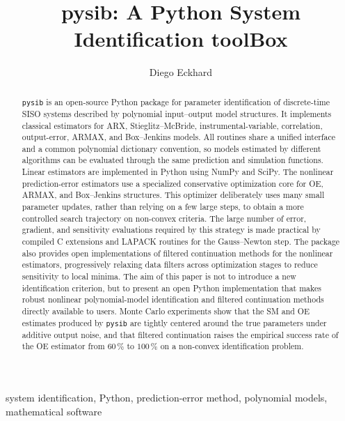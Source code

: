\documentclass{ifacconf}
\begin{document}
\begin{frontmatter}

\title{pysib: A Python System Identification toolBox}

\author[First]{Diego Eckhard}
\address[First]{Universidade Federal do Rio Grande do Sul, Porto Alegre, Brazil
  (e-mail: diegoeck@ufrgs.br)}

\begin{abstract}
\texttt{pysib} is an open-source Python package for parameter identification
of discrete-time SISO systems described by polynomial input--output model
structures.  It implements classical estimators for ARX, Stieglitz--McBride,
instrumental-variable, correlation, output-error, ARMAX, and Box--Jenkins
models.  All routines share a unified interface and a common polynomial
dictionary convention, so models estimated by different algorithms can be
evaluated through the same prediction and simulation functions.  Linear
estimators are implemented in Python using NumPy and SciPy.  The nonlinear
prediction-error estimators use a specialized conservative optimization core
for OE, ARMAX, and Box--Jenkins structures.  This optimizer deliberately uses
many small parameter updates, rather than relying on a few large steps, to
obtain a more controlled search trajectory on non-convex criteria.  The
large number of error, gradient, and sensitivity evaluations required by this
strategy is made practical by compiled C extensions and LAPACK routines for
the Gauss--Newton step.  The package also provides open implementations of
filtered continuation methods for the nonlinear estimators, progressively
relaxing data filters across optimization stages to reduce sensitivity to
local minima.  The aim of this paper is not to introduce a new
identification criterion, but to present an open Python implementation that
makes robust nonlinear polynomial-model identification and filtered
continuation methods directly available to users.  Monte Carlo experiments
show that the SM and OE estimates produced by \texttt{pysib} are tightly
centered around the true parameters under additive output noise, and that
filtered continuation raises the empirical success rate of the OE estimator
from $60\,\%$ to $100\,\%$ on a non-convex identification problem.
\end{abstract}

\begin{keyword}
system identification, Python, prediction-error method,
polynomial models, mathematical software
\end{keyword}

\end{frontmatter}
\end{document}
